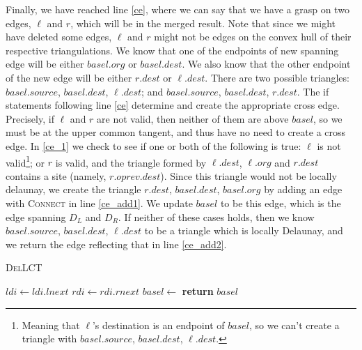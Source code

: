 \documentclass[12pt,twoside]{reedthesis}
\begin{document}
    Finally, we have reached line \ref{ce}, where we can say that we have a grasp on two edges, $\ell$ and $r$, which will be in the merged result. Note that since we might have deleted some edges, $\ell$ and $r$ might not be edges on the convex hull of their respective triangulations. We know that one of the endpoints of new spanning edge will be either $basel.org$ or $basel.dest$. We also know that the other endpoint of the new edge will be either $r.dest$ or $\ell.dest$. There are two possible triangles: $basel.source$, $basel.dest$, $\ell.dest$; and $basel.source$, $basel.dest$, $r.dest$. The if statements following line \ref{ce} determine and create the appropriate cross edge. Precisely, if $\ell$ and $r$ are not valid, then neither of them are above $basel$, so we must be at the upper common tangent, and thus have no need to create a cross edge. In \ref{ce_1} we check to see if one or both of the following is true: $\ell$ is not valid\footnote{Meaning that $\ell$'s destination is an endpoint of $basel$, so we can't create a triangle with $basel.source$, $basel.dest$, $\ell.dest$.}; or $r$ is valid, and the triangle formed by $\ell.dest$, $\ell.org$ and $r.dest$ contains a site (namely, $r.oprev.dest$). Since this triangle would not be locally delaunay, we create the triangle $r.dest$, $basel.dest$, $basel.org$ by adding an edge with \textsc{Connect} in line \ref{ce_add1}. We update $basel$ to be this edge, which is the  edge spanning $D_{L}$ and $D_{R}$. If neither of these cases holds, then we know $basel.source$, $basel.dest$, $\ell.dest$ to be a triangle which is locally Delaunay, and we return the edge reflecting that in line \ref{ce_add2}. 

    \begin{algorithm}[H]
    \caption{\textsc{DelLCT}}\label{del_lct}
     \begin{algorithmic}[1]
    \Loop
       \label{left_of}
        \State $ldi\gets ldi.lnext$ \label{inc_ldi}
       \label{right_of}
        \State $rdi\gets rdi.rnext$
      \Else
        \State $basel\gets$
        \State \textbf{return} $basel$ \label{lct_fin}
      \EndIf
    \EndLoop
    \EndProcedure
    \end{algorithmic} 
    \end{algorithm}
  
\end{document}
